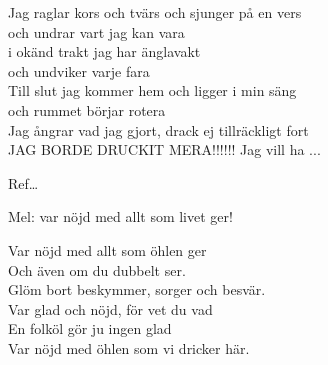 \begin{SongText}[Mer öl]
\begin{SongVerse}
        Jag raglar kors och tvärs och sjunger på en vers\\%
        och undrar vart jag kan vara\\%
        i okänd trakt jag har änglavakt\\%
        och undviker varje fara\\%
        Till slut jag kommer hem och ligger i min säng\\%
        och rummet börjar rotera\\%
        Jag ångrar vad jag gjort, drack ej tillräckligt fort\\%
        JAG BORDE DRUCKIT MERA!!!!!! Jag vill ha ...
    \end{SongVerse}
    \begin{SongVerse}
        Ref…
    \end{SongVerse}
\end{SongText}
\begin{SongText}
    \begin{SongInfo}
        Mel: var nöjd med allt som livet ger!
    \end{SongInfo}
    \begin{SongVerse}
        Var nöjd med allt som öhlen ger\\%
        Och även om du dubbelt ser.\\%
        Glöm bort beskymmer, sorger och besvär.\\%
        Var glad och nöjd, för vet du vad\\%
        En folköl gör ju ingen glad\\%
        Var nöjd med öhlen som vi dricker här.
    \end{SongVerse}
\end{SongText}
